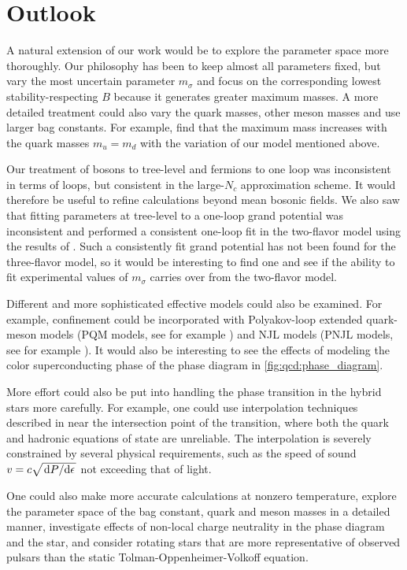 \section{Outlook}

A natural extension of our work would be to
explore the parameter space more thoroughly.
Our philosophy has been to keep almost all parameters fixed,
but vary the most uncertain parameter $m_\sigma$ and focus on the corresponding lowest stability-respecting $B$
because it generates greater maximum masses.
A more detailed treatment could also vary the quark masses,
other meson masses and use larger bag constants.
For example, \cite{ref:lsm3f_compact_stars}
find that the maximum mass increases with the quark masses $m_u=m_d$
with the variation of our model mentioned above.

Our treatment of bosons to tree-level and fermions to one loop was inconsistent in terms of loops,
but consistent in the large-$N_c$ approximation scheme.
It would therefore be useful to refine calculations beyond mean bosonic fields.
We also saw that fitting parameters at tree-level to a one-loop grand potential was inconsistent
and performed a consistent one-loop fit in the two-flavor model using the results of \cite{ref:jo_lsm_consistent_chiral,ref:jo_lsm_consistent_physical}.
Such a consistently fit grand potential has not been found for the three-flavor model,
so it would be interesting to find one and see if the ability to fit experimental values of $m_\sigma$ carries over from the two-flavor model.

Different and more sophisticated effective models could also be examined.
For example, confinement could be incorporated with Polyakov-loop extended quark-meson models (PQM models, see for example \cite{ref:pqm_2f,ref:pqm_3f,ref:master_folkestad}) and NJL models (PNJL models, see for example \cite{ref:pnjl_2f,ref:pnjl_3f,ref:pnjl_3f_zeroT}).
It would also be interesting to see the effects of modeling the color superconducting phase of the phase diagram in \cref{fig:qcd:phase_diagram}.

More effort could also be put into handling the phase transition in the hybrid stars more carefully.
For example, one could use interpolation techniques described in \cite{ref:quark_star_review}
near the intersection point of the transition,
where both the quark and hadronic equations of state are unreliable.
The interpolation is severely constrained by several physical requirements,
such as the speed of sound $v = c \sqrt{\odv{P}/{\epsilon}}$ not exceeding that of light.

One could also make more accurate calculations at nonzero temperature,
explore the parameter space of the bag constant, quark and meson masses in a detailed manner,
investigate effects of non-local charge neutrality in the phase diagram and the star,
and consider rotating stars that are more representative of observed pulsars than the static Tolman-Oppenheimer-Volkoff equation.
